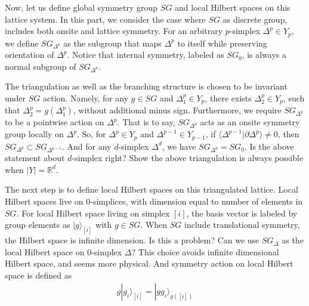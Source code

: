 \documentclass[%
  reprint,
  amsmath,amssymb,
  aps,pra,
]{revtex4-1}
\begin{document}
Now, let us define global symmetry group $SG$ and local Hilbert spaces on this lattice system. 
In this part, we consider the case where $SG$ as discrete group, includes both onsite and lattice symmetry.
For an arbitrary $p$-simplex $\Delta^p\in Y_p$, we define $SG_{\Delta^p}$ as the subgroup that maps $\Delta^p$ to itself while preserving orientation of $\Delta^p$.
Notice that internal symmetry, labeled as $SG_0$, is always a normal subgroup of $SG_{\Delta^p}$.

The triangulation as well as the branching structure is chosen to be invariant under $SG$ action.
Namely, for any $g\in SG$ and $\Delta_1^p\in Y_p$, there exists $\Delta^p_2\in Y_p$, such that $\Delta^p_2=g(\Delta^p_1)$, without additional minus sign.
Furthermore, we require $SG_{\Delta^p}$ to be a pointwise action on ${\Delta^p}$. 
That is to say, $SG_{\Delta^p}$ acts as an onsite symmetry group locally on $\Delta^p$.
So, for $\Delta^p\in Y_p$ and $\Delta^{p-1}\in Y_{p-1}$, if $\langle\Delta^{p-1}|\partial\Delta^p\rangle\neq0$, then $SG_{\Delta^p}\subset SG_{\Delta^{p-1}}$.
And for any $d$-simplex $\Delta^d$, we have $SG_{\Delta^d}=SG_0$. 
{\color{red} Is the above statement about $d$-simplex right? Show the above triangulation is always possible when $|Y|=\mathbb{R}^d$.}

The next step is to define local Hilbert spaces on this triangulated lattice.
Local Hilbert spaces live on 0-simplices, with dimension equal to number of elements in $SG$.
For local Hilbert space living on simplex $[i]$, the basis vector is labeled by group elements as $|g\rangle_{[i]}$ with $g\in SG$.
{\color{red} When $SG$ include translational symmetry, the Hilbert space is infinite dimension. Is this a problem?
Can we use $SG_\Delta$ as the local Hilbert space on 0-simplex $\Delta$? This choice avoids infinite dimensional Hilbert space, and seems more physical.}
And symmetry action on local Hilbert space is defined as
\begin{align}
  g|g_i\rangle_{[i]}=|g g_i\rangle_{g([i])}%
  \label{}
\end{align}
\end{document}
